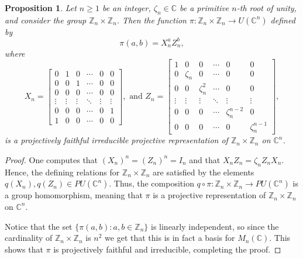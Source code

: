 \documentclass[11pt, oneside, reqno]{amsart}
\newcommand{\bbZ}{\mathbb{Z}}
\newcommand{\bbC}{\mathbb{C}}
\theoremstyle{definition}
\theoremstyle{plain}
\newtheorem{proposition}[definition]{Proposition}
\theoremstyle{remark}
\begin{document}
\begin{proposition}\label{prop:projective error models exist}
    Let $n \geq 1$ be an integer, $\zeta_n \in \bbC$ be a primitive $n$-th root of unity, and consider the group $\bbZ_n \times \bbZ_n$. Then the function $\pi \colon \bbZ_n \times \bbZ_n \to U(\bbC^n)$ defined by
    \begin{equation*}
        \pi(a,b) = X_n^a Z_n^b,
    \end{equation*}
    where
    \begin{equation*}
        X_n =
        \begin{bmatrix}
            0 & 1 & 0 & \cdots & 0 & 0 \\
            0 & 0 & 1 & \cdots & 0 & 0 \\
            0 & 0 & 0 & \cdots & 0 & 0 \\
            \vdots & \vdots & \vdots & \ddots & \vdots & \vdots \\
            0 & 0 & 0 & \cdots & 0 & 1 \\
            1 & 0 & 0 & \cdots & 0 & 0
        \end{bmatrix},
        \text{ and }
        Z_n =
        \begin{bmatrix}
            1 & 0 & 0 & \cdots & 0 & 0 \\
            0 & \zeta_n & 0 & \cdots & 0 & 0 \\
            0 & 0 & \zeta_n^2 & \cdots & 0 & 0 \\
            \vdots & \vdots & \vdots & \ddots & \vdots & \vdots \\
            0 & 0 & 0 & \cdots & \zeta_n^{n-2} & 0 \\
            0 & 0 & 0 & \cdots & 0 & \zeta_n^{n-1}
        \end{bmatrix},
    \end{equation*}
    is a projectively faithful irreducible projective representation of $\bbZ_n \times \bbZ_n$ on $\bbC^n$.
\end{proposition}
\begin{proof}
    One computes that $(X_n)^n = (Z_n)^n = I_n$ and that $X_nZ_n = \zeta_n Z_nX_n$. Hence, the defining relations for $\bbZ_n \times \bbZ_n$ are satisfied by the elements $q(X_n),q(Z_n) \in PU(\bbC^n)$. Thus, the composition $q \circ \pi \colon \bbZ_n \times \bbZ_n \to PU(\bbC^n)$ is a group homomorphism, meaning that $\pi$ is a projective representation of $\bbZ_n \times \bbZ_n$ on $\bbC^n$.

    Notice that the set $\{\pi(a,b) \colon a,b \in \bbZ_n \}$ is linearly independent, so since the cardinality of $\bbZ_n \times \bbZ_n$ is $n^2$ we get that this is in fact a basis for $M_n(\bbC)$. This shows that $\pi$ is projectively faithful and irreducible, completing the proof.
\end{proof}
\end{document}
